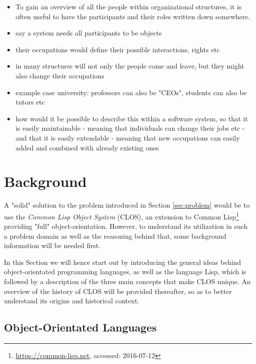 \documentclass[oribibl]{llncs}
\begin{document}
\begin{itemize}
\item To gain an overview of all the people within organizational structures, it is often useful to have the participants and their roles written down somewhere. 
\item say a system needs all participants to be objects
\item their occupations would define their possible interactions, rights etc
\item in many structures will not only the people come and leave, but they might also change their occupations
\item example case university: professors can also be "CEOs", students can also be tutors etc
\item how would it be possible to describe this within a software system, so that it is easily maintainable - meaning that individuals can change their jobs etc - and that it is easily extendable - meaning that new occupations can easily added and combined with already existing ones
\end{itemize}


\section{Background}
\label{sec:background}
A "solid" solution to the problem introduced in Section \ref{sec:problem} would be to use the \emph{Common Lisp Object System} (CLOS), an extension to Common Lisp\footnote{\url{https://common-lisp.net}, accessed: 2016-07-12} providing "full" object-orientation. \cite{demichiel1987common} However, to understand its utilization in such a problem domain as well as the reasoning behind that, some background information will be needed first.

In this Section we will hence start out by introducing the general ideas behind object-orientated programming languages, as well as the language Lisp, which is followed by a description of the three main concepts that make CLOS unique. An overview of the history of CLOS will be provided thereafter, so as to better understand its origins and historical context.

\subsection{Object-Orientated Languages}
\label{sec:oo}
\end{document}

